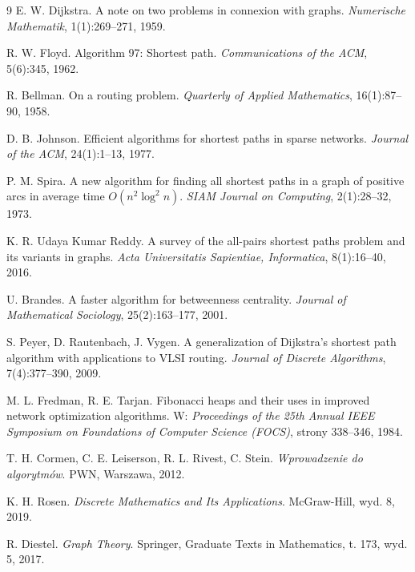 \begin{thebibliography}{9}
E. W. Dijkstra.
\newblock A note on two problems in connexion with graphs.
\newblock \emph{Numerische Mathematik}, 1(1):269--271, 1959.
 
R. W. Floyd.
\newblock Algorithm 97: Shortest path.
\newblock \emph{Communications of the ACM}, 5(6):345, 1962.

R. Bellman.
\newblock On a routing problem.
\newblock \emph{Quarterly of Applied Mathematics}, 16(1):87--90, 1958.

D. B. Johnson.
\newblock Efficient algorithms for shortest paths in sparse networks.
\newblock \emph{Journal of the ACM}, 24(1):1--13, 1977.

P. M. Spira.
\newblock A new algorithm for finding all shortest paths in a graph of positive arcs in average time $O(n^2\log^2 n)$.
\newblock \emph{SIAM Journal on Computing}, 2(1):28--32, 1973.

K. R. Udaya Kumar Reddy.
\newblock A survey of the all-pairs shortest paths problem and its variants
  in graphs.
\newblock \emph{Acta Universitatis Sapientiae, Informatica}, 8(1):16--40,
  2016.

U. Brandes.
\newblock A faster algorithm for betweenness centrality.
\newblock \emph{Journal of Mathematical Sociology}, 25(2):163--177, 2001.

S. Peyer, D. Rautenbach, J. Vygen.
\newblock A generalization of {Dijkstra's} shortest path algorithm
  with applications to {VLSI} routing.
\newblock \emph{Journal of Discrete Algorithms}, 7(4):377--390, 2009.

M. L. Fredman, R. E. Tarjan.
\newblock Fibonacci heaps and their uses in improved network
  optimization algorithms.
\newblock W: \emph{Proceedings of the 25th Annual IEEE Symposium
  on Foundations of Computer Science (FOCS)}, strony 338--346, 1984.

T. H. Cormen, C. E. Leiserson, R. L. Rivest, C. Stein.
\newblock \emph{Wprowadzenie do algorytmów}.
\newblock PWN, Warszawa, 2012.

K. H. Rosen.
\newblock \emph{Discrete Mathematics and Its Applications}.
\newblock McGraw-Hill, wyd. 8, 2019.

R. Diestel.
\newblock \emph{Graph Theory}.
\newblock Springer, Graduate Texts in Mathematics, t. 173, wyd. 5, 2017.


\end{thebibliography}
